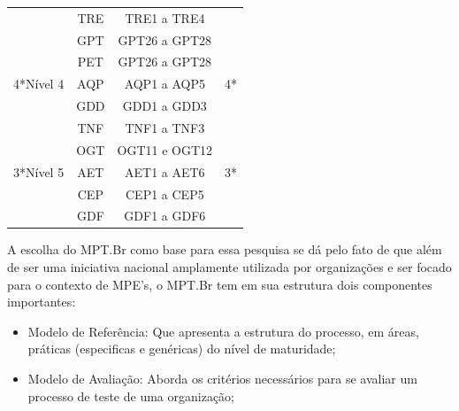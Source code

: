 \begin{table}[H]
{\begin{tabular}{|l|l|l|l|}
    \cline{2-3}
    \multicolumn{1}{|c|}{} & \multicolumn{1}{c|}{TRE} & \multicolumn{1}{c|}{TRE1 a TRE4} & \multicolumn{1}{c|}{} \\ 
    \cline{2-3}
    \multicolumn{1}{|c|}{} & \multicolumn{1}{c|}{GPT} & \multicolumn{1}{c|}{GPT26 a GPT28} & \multicolumn{1}{c|}{} \\ 
    \cline{2-3}
    \multicolumn{1}{|c|}{} & \multicolumn{1}{c|}{PET} & \multicolumn{1}{c|}{GPT26 a GPT28} & \multicolumn{1}{c|}{} \\ 
    \hline
    \multicolumn{1}{|c|}{4*Nível 4} & \multicolumn{1}{c|}{AQP} & \multicolumn{1}{c|}{AQP1 a AQP5} & \multicolumn{1}{c|}{4*} \\ 
    \cline{2-3}
    \multicolumn{1}{|c|}{} & \multicolumn{1}{c|}{GDD} & \multicolumn{1}{c|}{GDD1 a GDD3} & \multicolumn{1}{c|}{} \\ 
    \cline{2-3}
    \multicolumn{1}{|c|}{} & \multicolumn{1}{c|}{TNF} & \multicolumn{1}{c|}{TNF1 a TNF3} & \multicolumn{1}{c|}{} \\ 
    \cline{2-3}
    \multicolumn{1}{|c|}{} & \multicolumn{1}{c|}{OGT} & \multicolumn{1}{c|}{OGT11 e OGT12} & \multicolumn{1}{c|}{} \\ 
    \hline
    \multicolumn{1}{|c|}{3*Nível 5} & \multicolumn{1}{c|}{AET} & \multicolumn{1}{c|}{AET1 a AET6} & \multicolumn{1}{c|}{3*} \\ 
    \cline{2-3}
    \multicolumn{1}{|c|}{} & \multicolumn{1}{c|}{CEP} & \multicolumn{1}{c|}{CEP1 a CEP5} & \multicolumn{1}{c|}{} \\ 
    \cline{2-3}
    \multicolumn{1}{|c|}{} & \multicolumn{1}{c|}{GDF} & \multicolumn{1}{c|}{GDF1 a GDF6} & \multicolumn{1}{c|}{} \\ 
    \hline
    \end{tabular}
}
\end{table}

A escolha do MPT.Br como base para essa pesquisa se dá pelo fato de que além de ser uma iniciativa nacional amplamente utilizada por organizações e ser focado para o contexto de MPE's, o MPT.Br tem em sua estrutura dois componentes importantes: 

\begin{itemize}
    \item Modelo de Referência: Que apresenta a estrutura do processo, em áreas, práticas (especificas e genéricas) do nível de maturidade;
    \item Modelo de Avaliação: Aborda os critérios necessários para se avaliar um processo de teste de uma organização;
\end{itemize}

